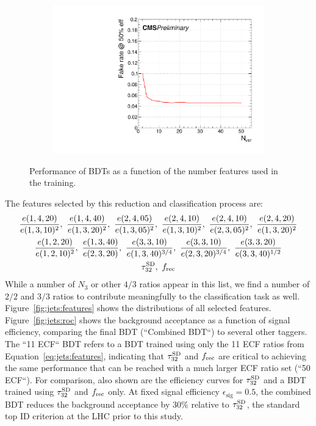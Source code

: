 \begin{figure}[]
    \begin{center}
        \begin{subfigure}[t]{0.4\textwidth}
            \includegraphics[width=\textwidth]{figures/toptagging/bdt/fakerate_vs_eff50.pdf}
        \end{subfigure}
        \caption{Performance of BDTs as a function of the number features used in the training.}
        \label{fig:jets:training}
    \end{center}
\end{figure}

The features selected by this reduction and classification process are:
\begin{gather}
    \frac{e(1,4,20)}{e(1,3,10)^2},~
    \frac{e(1,4,40)}{e(1,3,20)^2},~
    \frac{e(2,4,05)}{e(1,3,05)^2},~
    \frac{e(2,4,10)}{e(1,3,10)^2},~
    \frac{e(2,4,10)}{e(2,3,05)^2},~
    \frac{e(2,4,20)}{e(1,3,20)^2} \nonumber \\ 
    \frac{e(1,2,20)}{e(1,2,10)^2},~
    \frac{e(1,3,40)}{e(2,3,20)},~
    \frac{e(3,3,10)}{e(1,3,40)^{3/4}},~
    \frac{e(3,3,10)}{e(2,3,20)^{3/4}},~
    \frac{e(3,3,20)}{e(3,3,40)^{1/2}}\nonumber \\ 
    \tau_{32}^{\mathrm{SD}},~ f_\mathrm{rec} 
    \label{eq:jets:features}
\end{gather}
While a number of $N_3$ or other $4/3$ ratios appear in this list, we find a number of $2/2$ and $3/3$ ratios to contribute meaningfully to the classification task as well. 
Figure~\ref{fig:jets:features} shows the distributions of all selected features. 
Figure~\ref{fig:jets:roc} shows the background acceptance as a function of signal efficiency, comparing the final BDT (``Combined BDT``) to several other taggers.
The ``11 ECF`` BDT refers to a BDT trained using only the 11 ECF ratios from Equation~\ref{eq:jets:features}, indicating that $\tau_{32}^{\mathrm{SD}}$ and $f_\mathrm{rec}$ are critical to achieving the same performance that can be reached with a much larger ECF ratio set (``50 ECF``).
For comparison, also shown are the efficiency curves for $\tau_{32}^{\mathrm{SD}}$ and a BDT trained using $\tau_{32}^{\mathrm{SD}}$ and $f_\mathrm{rec}$ only.
At fixed signal efficiency $\epsilon_\mathrm{sig} = 0.5$, the combined BDT reduces the background acceptance by 30\% relative to $\tau_{32}^{\mathrm{SD}}$, the standard top ID criterion at the LHC prior to this study. 


